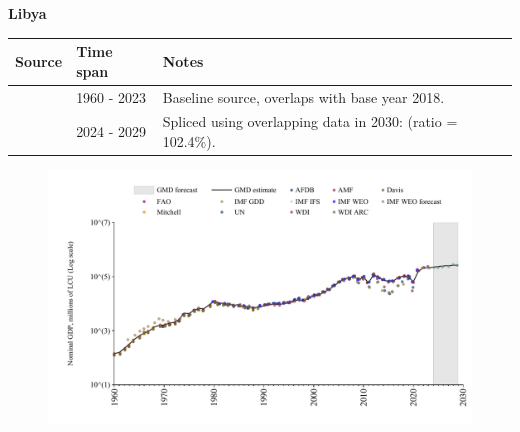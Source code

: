 \documentclass[12pt,a4paper,landscape]{article}
\begin{document}
\begin{adjustbox}{max totalsize={\paperwidth}{\paperheight},center}
\begin{minipage}[t][\textheight][t]{\textwidth}
\vspace*{0.5cm}
{}
\begin{center}
{\Large\bfseries Libya}
\end{center}
\vspace{0.5cm}
\begin{table}[H]
\centering
\small
\begin{tabular}{|l|l|l|}
\hline
\textbf{Source} & \textbf{Time span} & \textbf{Notes} \\
\hline
\rowcolor{white}\cite{WDI}& 1960 - 2023 &Baseline source, overlaps with base year 2018.\\
\rowcolor{lightgray}\cite{IMF_WEO_forecast}& 2024 - 2029 &Spliced using overlapping data in 2030: (ratio = 102.4\%).\\
\hline
\end{tabular}
\end{table}
\begin{figure}[H]
\centering
\includegraphics[width=\textwidth,height=0.6\textheight,keepaspectratio]{graphs/LBY_nGDP.pdf}
\end{figure}
\end{minipage}
\end{adjustbox}
\end{document}
